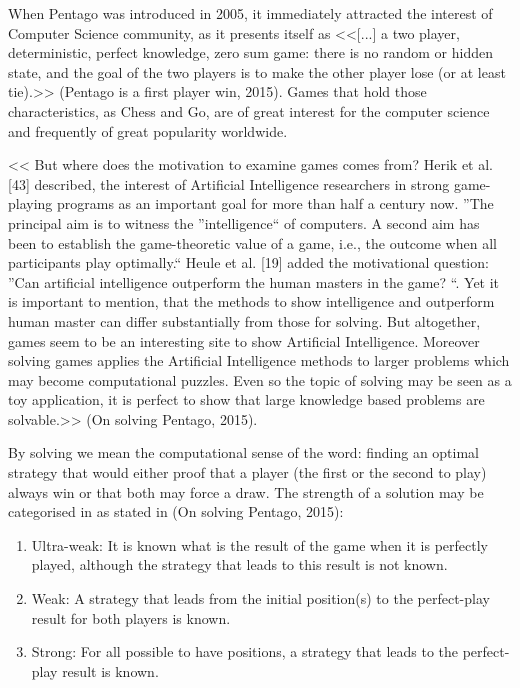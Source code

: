When Pentago was introduced in 2005, it immediately attracted the interest of
Computer Science community, as it presents itself as <<[...] a two player,
deterministic, perfect knowledge, zero sum game: there is no random or hidden
state, and the goal of the two players is to make the other player lose (or at
least tie).>> (Pentago is a first player win, 2015). Games that hold those
characteristics, as Chess and Go, are of great interest for the computer
science and frequently of great popularity worldwide.

\vspace{10pt}

<< But where does the motivation to examine games comes from? Herik et al. [43]
described, the interest of Artificial Intelligence researchers in strong
game-playing programs as an important goal for more than half a century now.
”The principal aim is to witness the ”intelligence“ of computers. A second aim
has been to establish the game-theoretic value of a game, i.e., the outcome
when all participants play optimally.“ Heule et al. [19] added the motivational
question: ”Can artificial intelligence outperform the human masters in the
game? “. Yet it is important to mention, that the methods to show intelligence
and outperform human master can differ substantially from those for solving.
But altogether, games seem to be an interesting site to show Artificial
Intelligence. Moreover solving games applies the Artificial Intelligence
methods to larger problems which may become computational puzzles. Even so the
topic of solving may be seen as a toy application, it is perfect to show that
large knowledge based problems are solvable.>> (On solving Pentago, 2015).

\vspace{10pt}

By solving we mean the computational sense of the word: finding an optimal
strategy that would either proof that a player (the first or the second to
play) always win or that both may force a draw. The strength of a solution may
be categorised in as stated in (On solving Pentago, 2015):


\begin{enumerate}
  \item Ultra-weak: It is known what is the result of the game when it is
  perfectly played, although the strategy that leads to this result is not known.
	
  \item Weak: A strategy that leads from the initial position(s) to the
  perfect-play result for both players is known.
  
  \item  Strong: For all possible to have positions, a strategy that leads to
  the perfect-play result is known.

\end{enumerate}

